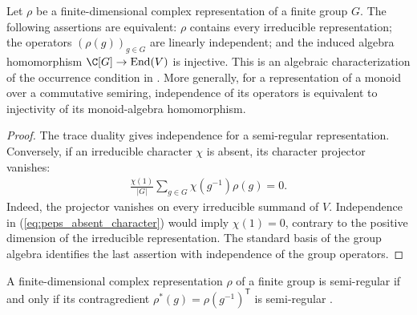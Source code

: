 \begin{lemma}
    \label{thm:peps_semiregular_group_algebra}
    \leanok
    Let $\rho$ be a finite-dimensional complex representation of a finite
    group $G$. The following assertions are equivalent:
    $\rho$ contains every irreducible representation; the operators
    $(\rho(g))_{g\in G}$ are linearly independent; and the induced algebra
    homomorphism $\C[G]\to\operatorname{End}(V)$ is injective.
    This is an algebraic characterization of the occurrence condition in
    \cite[Definition~4.5 and Lemma~4.6]{Schuch2010PEPS}.
    More generally, for a representation of a monoid over a commutative
    semiring, independence of its operators is equivalent to injectivity
    of its monoid-algebra homomorphism.
\end{lemma}

\begin{proof}\leanok
    The trace duality gives independence for a semi-regular
    representation. Conversely, if an irreducible character $\chi$ is
    absent, its character projector vanishes:
    \begin{align}
        \frac{\chi(1)}{|G|}\sum_{g\in G}\chi(g^{-1})\rho(g)=0.
        \label{eq:peps_absent_character}
    \end{align}
    Indeed, the projector vanishes on every irreducible summand of $V$.
    Independence in (\ref{eq:peps_absent_character}) would imply
    $\chi(1)=0$, contrary to the positive dimension of the irreducible
    representation. The standard basis of the group algebra identifies
    the last assertion with independence of the group operators.
\end{proof}

\begin{lemma}
    \label{thm:peps_semiregular_dual}
    \leanok
    A finite-dimensional complex representation $\rho$ of a finite group
    is semi-regular if and only if its contragredient
    $\rho^*(g)=\rho(g^{-1})^{\mathsf T}$ is semi-regular
    \cite[Definition~5.1 and Lemma~5.2]{Schuch2010PEPS}.
\end{lemma}

